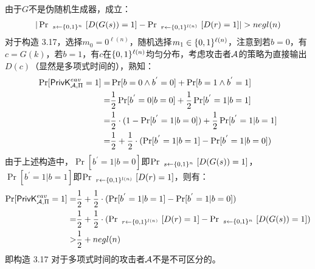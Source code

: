 \begin{questions}
        \begin{solution}
            \newline
            由于$G$不是伪随机生成器，成立：
            \begin{equation}
                \begin{aligned}
                    |\Pr\ _{s\leftarrow{\set{0,1}^n}}\ [D(G(s))=1]-\Pr\ _{r\leftarrow{\set{0,1}^{l(n)}}}\ [D(r)=1]|>{negl}(n)
                \end{aligned}
            \end{equation}
            对于构造 3.17，选择$m_0=0^{\ell(n)}$，随机选择$m_1\in\{{0,1}\}^{\ell(n)}$，注意到若$b=0$，有$c=G(k)$，若$b=1$，有$c$在$\{{0,1}\}^{\ell(n)}$均匀分布，考虑攻击者$\mathcal{A}$的策略为直接输出$D(c)$（显然是多项式时间的），熟知：
            \begin{equation}
                \begin{aligned}
                    \Pr[\mathsf{PrivK}^{eav}_{\mathcal{A},\Pi}=1]=&\Pr[b=0\wedge{b}^{'}=0]+\Pr[b=1\wedge{b}^{'}=1]\\
                    =&\frac{1}{2}\Pr[{b}^{'}=0|b=0]+\frac{1}{2}\Pr[{b}^{'}=1|b=1]\\
                    =&\frac{1}{2}\cdot(1-\Pr[{b}^{'}=1|b=0])+\frac{1}{2}\Pr[{b}^{'}=1|b=1]\\
                    =&\frac{1}{2}+\frac{1}{2}\cdot(\Pr[{b}^{'}=1|b=1]-\Pr[{b}^{'}=1|b=0])
                \end{aligned}
            \end{equation}
            由于上述构造中，$\Pr[{b}^{'}=1|b=0]$即$\Pr\ _{s\leftarrow{\set{0,1}^n}}\ [D(G(s))=1]$，$\Pr[{b}^{'}=1|b=1]$即$\Pr\ _{r\leftarrow{\set{0,1}^{l(n)}}}\ [D(r)=1]$，则有：
            \begin{equation}
                \begin{aligned}
                    \Pr[\algo{PrivK}^{eav}_{\Adv,\Pi}=1]=&\frac{1}{2}+\frac{1}{2}\cdot(\Pr[{b}^{'}=1|b=1]-\Pr[{b}^{'}=1|b=0])\\
                    =&\frac{1}{2}+\frac{1}{2}\cdot(\Pr\ _{r\leftarrow{\set{0,1}^{l(n)}}}\ [D(r)=1]-\Pr\ _{s\leftarrow{\set{0,1}^n}}\ [D(G(s))=1])\\
                    >&\frac{1}{2}+negl(n)
                \end{aligned}
            \end{equation}
            即构造 3.17 对于多项式时间的攻击者$\mathcal{A}$不是不可区分的。
        \end{solution}

\end{questions}



